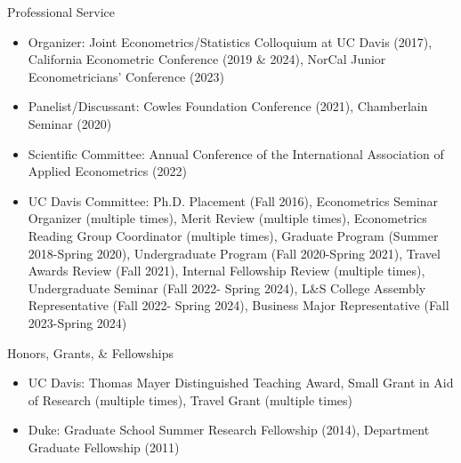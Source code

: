 \documentclass{article}
\begin{document}
\bigskip\noindent Professional Service 
\begin{itemize}
\item[] Organizer: 
Joint Econometrics/Statistics Colloquium at UC Davis (2017), %
California Econometric Conference (2019 \& 2024), %
NorCal Junior Econometricians’ Conference (2023) %
\item[] Panelist/Discussant: 
Cowles Foundation Conference (2021), %
Chamberlain Seminar (2020)%
\item[] Scientific Committee: 
Annual Conference of the International Association of Applied Econometrics (2022)
\item[] UC Davis Committee: 
Ph.D. Placement (Fall 2016), 
Econometrics Seminar Organizer  (multiple times), 
Merit Review (multiple times), 
Econometrics Reading Group Coordinator (multiple times), 
Graduate Program (Summer 2018-Spring 2020),
Undergraduate Program  (Fall 2020-Spring 2021),
Travel Awards Review  (Fall 2021),
Internal Fellowship Review  (multiple times),
Undergraduate Seminar (Fall 2022- Spring 2024), 
L\&S College Assembly Representative (Fall 2022- Spring 2024), 
Business Major Representative (Fall 2023-Spring 2024)
\end{itemize}
\bigskip\noindent Honors, Grants, \& Fellowships 
\begin{itemize}
\item[] UC Davis: Thomas Mayer Distinguished Teaching Award, Small Grant in Aid of Research (multiple times), Travel Grant (multiple times)
\item[] Duke:  Graduate School Summer Research Fellowship (2014), Department Graduate Fellowship (2011)
\end{itemize}
\end{document}
